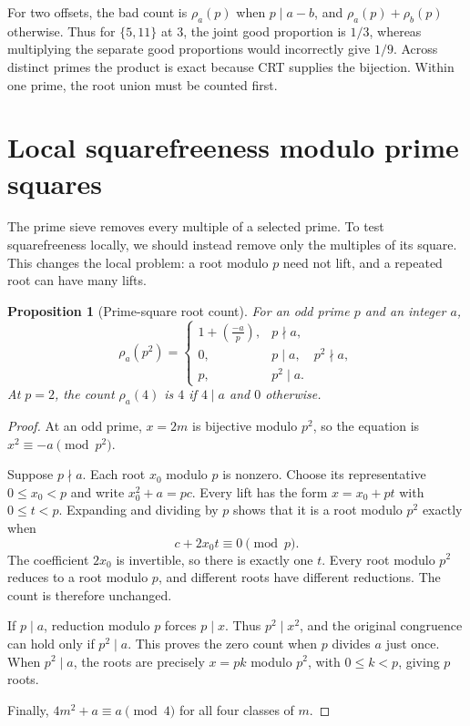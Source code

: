 \documentclass[11pt]{article}
\newtheorem{proposition}[theorem]{Proposition}
\theoremstyle{definition}
\theoremstyle{remark}
\newcommand{\leg}[2]{\left(\frac{#1}{#2}\right)}
\begin{document}
For two offsets, the bad count is $\rho_a(p)$ when $p\mid a-b$,
and $\rho_a(p)+\rho_b(p)$ otherwise. Thus for $\{5,11\}$ at $3$,
the joint good proportion is $1/3$, whereas multiplying the separate
good proportions would incorrectly give $1/9$.
Across distinct primes the product is exact because CRT supplies the
bijection. Within one prime, the root union must be counted first.

\section{Local squarefreeness modulo prime squares}
The prime sieve removes every multiple of a selected prime.
To test squarefreeness locally, we should instead remove only the
multiples of its square. This changes the local problem: a root
modulo $p$ need not lift, and a repeated root can have many lifts.

\begin{proposition}[Prime-square root count]\label{prop:square-roots}
For an odd prime $p$ and an integer $a$,
\[
 \rho_a(p^2)=
 \begin{cases}
 1+\leg{-a}{p},&p\nmid a,\\
 0,&p\mid a,\quad p^2\nmid a,\\
 p,&p^2\mid a.
 \end{cases}
\]
At $p=2$, the count $\rho_a(4)$ is $4$ if $4\mid a$ and $0$ otherwise.
\end{proposition}
\begin{proof}
At an odd prime, $x=2m$ is bijective modulo $p^2$, so the equation
is $x^2\equiv-a\pmod{p^2}$.

Suppose $p\nmid a$. Each root $x_0$ modulo $p$ is nonzero.
Choose its representative $0\le x_0<p$ and write
$x_0^2+a=pc$. Every lift has the form $x=x_0+pt$ with $0\le t<p$.
Expanding and dividing by $p$ shows that it is a root modulo $p^2$
exactly when
\[
 c+2x_0t\equiv0\pmod p.
\]
The coefficient $2x_0$ is invertible, so there is exactly one $t$.
Every root modulo $p^2$ reduces to a root modulo $p$, and different
roots have different reductions. The count is therefore unchanged.

If $p\mid a$, reduction modulo $p$ forces $p\mid x$.
Thus $p^2\mid x^2$, and the original congruence can hold only if
$p^2\mid a$. This proves the zero count when $p$ divides $a$ just once.
When $p^2\mid a$, the roots are precisely $x=pk$ modulo $p^2$,
with $0\le k<p$, giving $p$ roots.

Finally, $4m^2+a\equiv a\pmod4$ for all four classes of $m$.
\end{proof}
\end{document}
